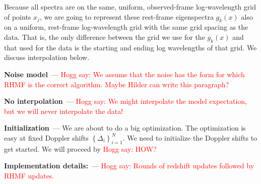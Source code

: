 \documentclass{article}
\renewcommand{\paragraph}[1]{\par\medskip\noindent\textbf{#1}~---}
\newcommand{\setof}[1]{\left\{{#1}\right\}}
\newcommand{\hoggsay}[1]{{\textcolor{red}{Hogg say: {#1}}}}
\begin{document}
Because all spectra are on the same, uniform, observed-frame log-wavelength grid of points $x_j$,
we are going to represent these rest-frame eigenspectra $g_k(x)$ also on a uniform, rest-frame log-wavelength grid with the same grid spacing as the data.
That is, the only difference between the grid we use for the $g_k(x)$ and that used for the data is the starting and ending log wavelengths of that grid.
We discuss interpolation below.

\paragraph{Noise model}
\hoggsay{We assume that the noise has the form for which RHMF is the correct algorithm. Maybe Hilder can write this paragraph?}

\paragraph{No interpolation}
\hoggsay{We might interpolate the model expectation, but we will never interpolate the data!}

\paragraph{Initialization}
We are about to do a big optimization.
The optimization is easy at fixed Doppler shifts $\setof{\Delta_i}_{i=1}^N$.
We need to initialize the Doppler shifts to get started.
We will proceed by \hoggsay{HOW?}

\paragraph{Implementation details:}
\hoggsay{Rounds of redshift updates followed by RHMF updates.}
\end{document}
